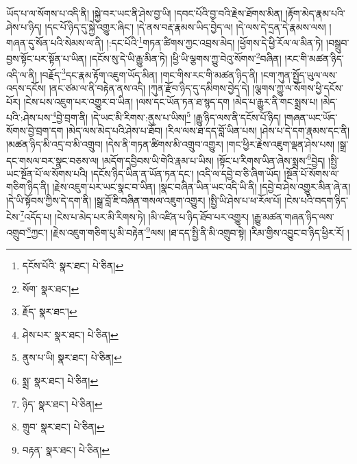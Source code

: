 ཡོད་པ་ལ་སོགས་པ་འདི་ནི། །སྐྱེ་བར་ཡང་ནི་ཤེས་བྱ་ཡི། །དབང་པོའི་བྱ་བའི་རྗེས་ཐོགས་མིན། །རྟོག་མེད་རྣམ་པའི་ཤེས་པ་ཉིད། །དང་པོ་ཉིད་དུ་སྐྱེ་འགྱུར་ཞིང་། །དེ་ནས་བརྡ་རྣམས་ཡིད་བྱེད་ལ། །དེ་ལས་དེ་དྲན་དེ་རྣམས་ལས། །གཞན་དུ་སོན་པའི་སེམས་ལ་ནི། །:དང་པོའི་\footnote{དངོས་པོའི་  སྣར་ཐང་།  པེ་ཅིན། }གཏན་ཚིགས་ཀྱང་འབྲས་མེད། །ཕྱོགས་དེ་ཕྱི་རོལ་ལ་མིན་ཏེ། །བསྒྲུབ་བྱས་སྟོང་པར་སྟོན་པ་ཡིན། །དངོས་སུ་དེ་ཡི་རྒྱུ་མིན་ཏེ། །ཕྱི་ཡི་ལྕགས་ཀྱུ་བེའུ་སོགས་\footnote{སོག་  སྣར་ཐང་། }བཞིན། །རང་གི་མཚན་ཉིད་འདི་ལ་ནི། །བརྗོད་\footnote{རྗོད་  སྣར་ཐང་། }དང་རྣམ་རྟོག་འཇུག་ཡོད་མིན། །གང་གིས་རང་གི་མཚན་ཉིད་ནི། །ངག་ཀུན་སྤྱོད་ཡུལ་ལས་འདས་དངོས། །ནང་ཙམ་ལ་ནི་བརྟེན་ནས་འདི། །ཀུན་རྫོབ་ཉིད་དུ་དམིགས་བྱེད་དེ། །ལྕགས་ཀྱུ་ལ་སོགས་ཕྱི་དངོས་པོར། །ངེས་པས་འཇུག་པར་འགྱུར་བ་ཡིན། །ལས་དང་ཡོན་ཏན་ཐ་སྙད་དག །མེད་པ་རྒྱུར་ནི་གང་སྨྲས་པ། །མེད་པའི་:ཤེས་པས་\footnote{ཤེས་པར་  སྣར་ཐང་།  པེ་ཅིན། }བྱེ་བྲག་ནི། །དེ་ཡང་མི་རིགས་:ནུས་པ་ཡིས།\footnote{ནུས་པ་ཡི།  སྣར་ཐང་།  པེ་ཅིན། } །རྒྱུ་ཉིད་ལས་ནི་དངོས་པོ་ཉིད། །གཞན་ཡང་ཡོད་སོགས་བྱེ་བྲག་དག །མེད་ལས་མེད་པའི་ཤེས་པ་ཐོབ། །རིལ་ལས་ཐ་དད་བློ་ཡིན་པས། །ཤེས་པ་དེ་དག་རྣམས་དང་ནི། །མཚན་ཉིད་མི་འདྲ་བ་མི་འགྲུབ། །དེས་ནི་གཏན་ཚིགས་མི་འགྲུབ་འགྱུར། །གང་ཕྱིར་རྗེས་འཇུག་ལྡན་ཤེས་པས། །སྒྲ་དང་གསལ་བར་སྣང་བཅས་ལ། །མདོག་དབྱིབས་ཡི་གེའི་རྣམ་པ་ཡིས། །སྟོང་པ་རིགས་ཡིན་ཞེས་སྨྲས་\footnote{སྨྲ་  སྣར་ཐང་།  པེ་ཅིན། }བྱེད། །སྤྱི་ཡང་སྔོན་པོ་ལ་སོགས་པའི། །དངོས་ཉིད་ཡིན་ན་ཡོན་ཏན་དང་། །འདི་ལ་དབྱེ་བ་ཅི་ཞིག་ཡོད། །སྔོན་པོ་སོགས་ལ་གཅིག་ཉིད་ནི། །རྗེས་འཇུག་པར་ཡང་སྣང་བ་ཡིན། །སྣང་བཞིན་ཡིན་ཡང་འདི་ཡི་ནི། །དབྱེ་བ་ཤེས་འགྱུར་མིན་ཞེ་ན། །དེ་ཡི་སྟོབས་ཀྱིས་དེ་དག་ནི། །སྒྲ་བློ་ཇི་བཞིན་གསལ་འཇུག་འགྱུར། །སྤྱི་ཡི་ཤེས་པ་ཕ་རོལ་པོ། །ངེས་པའི་བདག་ཉིད་ངེས་\footnote{ཉིད་  སྣར་ཐང་།  པེ་ཅིན། }འདོད་པ། །ངེས་པ་མེད་པར་མི་རིགས་ཏེ། །མི་འཛིན་པ་ཉིད་ཐོབ་པར་འགྱུར། །རྒྱུ་མཚན་གཞན་ཉིད་ལས་འགྲུབ་\footnote{གྲུབ་  སྣར་ཐང་།  པེ་ཅིན། }ཀྱང་། །རྗེས་འཇུག་གཅིག་པུ་མི་བརྟེན་\footnote{བརྟན་  སྣར་ཐང་།  པེ་ཅིན། }ལས། །ཐ་དད་སྤྱི་ནི་མི་འགྲུབ་སྟེ། །རིམ་གྱིས་འབྱུང་བ་ཉིད་ཕྱིར་རོ། །
